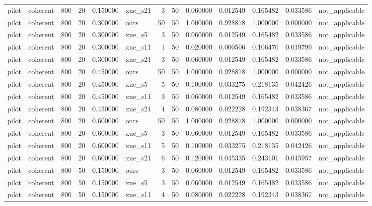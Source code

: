 \begin{longtable}{llrrrlrrrrrrl}
pilot & coherent & 800 & 20 & 0.150000 & xue\_s21 & 3 & 50 & 0.060000 & 0.012549 & 0.165482 & 0.033586 & not\_applicable \\
pilot & coherent & 800 & 20 & 0.300000 & ours & 50 & 50 & 1.000000 & 0.928878 & 1.000000 & 0.000000 & not\_applicable \\
pilot & coherent & 800 & 20 & 0.300000 & xue\_s5 & 3 & 50 & 0.060000 & 0.012549 & 0.165482 & 0.033586 & not\_applicable \\
pilot & coherent & 800 & 20 & 0.300000 & xue\_s11 & 1 & 50 & 0.020000 & 0.000506 & 0.106470 & 0.019799 & not\_applicable \\
pilot & coherent & 800 & 20 & 0.300000 & xue\_s21 & 3 & 50 & 0.060000 & 0.012549 & 0.165482 & 0.033586 & not\_applicable \\
pilot & coherent & 800 & 20 & 0.450000 & ours & 50 & 50 & 1.000000 & 0.928878 & 1.000000 & 0.000000 & not\_applicable \\
pilot & coherent & 800 & 20 & 0.450000 & xue\_s5 & 5 & 50 & 0.100000 & 0.033275 & 0.218135 & 0.042426 & not\_applicable \\
pilot & coherent & 800 & 20 & 0.450000 & xue\_s11 & 3 & 50 & 0.060000 & 0.012549 & 0.165482 & 0.033586 & not\_applicable \\
pilot & coherent & 800 & 20 & 0.450000 & xue\_s21 & 4 & 50 & 0.080000 & 0.022228 & 0.192343 & 0.038367 & not\_applicable \\
pilot & coherent & 800 & 20 & 0.600000 & ours & 50 & 50 & 1.000000 & 0.928878 & 1.000000 & 0.000000 & not\_applicable \\
pilot & coherent & 800 & 20 & 0.600000 & xue\_s5 & 3 & 50 & 0.060000 & 0.012549 & 0.165482 & 0.033586 & not\_applicable \\
pilot & coherent & 800 & 20 & 0.600000 & xue\_s11 & 5 & 50 & 0.100000 & 0.033275 & 0.218135 & 0.042426 & not\_applicable \\
pilot & coherent & 800 & 20 & 0.600000 & xue\_s21 & 6 & 50 & 0.120000 & 0.045335 & 0.243101 & 0.045957 & not\_applicable \\
pilot & coherent & 800 & 50 & 0.150000 & ours & 3 & 50 & 0.060000 & 0.012549 & 0.165482 & 0.033586 & not\_applicable \\
pilot & coherent & 800 & 50 & 0.150000 & xue\_s5 & 3 & 50 & 0.060000 & 0.012549 & 0.165482 & 0.033586 & not\_applicable \\
pilot & coherent & 800 & 50 & 0.150000 & xue\_s11 & 4 & 50 & 0.080000 & 0.022228 & 0.192343 & 0.038367 & not\_applicable \\

\end{longtable}
